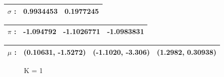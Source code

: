 \documentclass[12pt]{article}
\begin{document}
\begin{center}
  \begin{table}[h]
    \centering
    \begin{tabular}{|| c c c ||}
      \hline
      $\sigma$ : & 0.9934453& 0.1977245\\
      \hline
    \end{tabular}
  \end{table}
\end{center}

\begin{center}
  \begin{table}[h]
    \centering
    \begin{tabular}{|| c c c c ||}
      \hline
      $\pi$ :& -1.094792& -1.1026771& -1.0983831\\
      \hline
    \end{tabular}
  \end{table}
\end{center}

\begin{center}
  \begin{table}[h]
    \centering
    \begin{tabular}{|| c c c c ||}
      \hline
      $\mu$ :& (0.10631, -1.5272)& (-1.1020, -3.306)& (1.2982, 0.30938)\\
      \hline
    \end{tabular}
  \end{table}
\end{center}

\begin{figure}[h]
    \centering 
    \hfill
    \caption{K = 1}
\end{figure}
\end{document}
